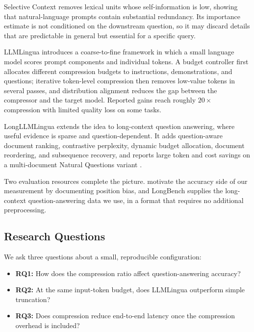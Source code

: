 \documentclass[10pt,a4paper,twocolumn]{article}
\begin{document}
Selective Context \citep{li-etal-2023-compressing} removes lexical units whose
self-information is low, showing that natural-language prompts contain
substantial redundancy. Its importance estimate is not conditioned on the
downstream question, so it may discard details that are predictable in general but
essential for a specific query.

LLMLingua \citep{jiang-etal-2023-llmlingua} introduces a coarse-to-fine framework
in which a small language model scores prompt components and individual tokens.
A budget controller first allocates different compression budgets to instructions,
demonstrations, and questions; iterative token-level compression then removes
low-value tokens in several passes, and distribution alignment reduces the gap
between the compressor and the target model. Reported gains reach roughly
$20\times$ compression with limited quality loss on some tasks.

LongLLMLingua \citep{jiang-etal-2024-longllmlingua} extends the idea to
long-context question answering, where useful evidence is sparse and
question-dependent. It adds question-aware document ranking, contrastive
perplexity, dynamic budget allocation, document reordering, and subsequence
recovery, and reports large token and cost savings on a multi-document Natural
Questions variant \citep{kwiatkowski-etal-2019-natural}.

Two evaluation resources complete the picture. \citet{liu-etal-2024-lost} motivate
the accuracy side of our measurement by documenting position bias, and LongBench
\citep{bai-etal-2024-longbench} supplies the long-context question-answering data
we use, in a format that requires no additional preprocessing.

\subsection{Research Questions}

We ask three questions about a small, reproducible configuration:

\begin{itemize}
    \item \textbf{RQ1:} How does the compression ratio affect question-answering
    accuracy?
    \item \textbf{RQ2:} At the same input-token budget, does LLMLingua outperform
    simple truncation?
    \item \textbf{RQ3:} Does compression reduce end-to-end latency once the
    compression overhead is included?
\end{itemize}
\end{document}
